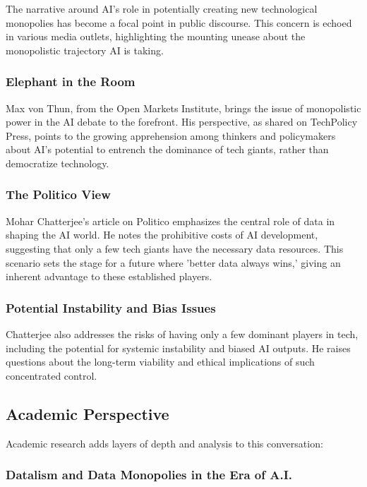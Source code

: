 \documentclass[11pt]{article}
\begin{document}
The narrative around AI's role in potentially creating new technological monopolies has become a focal point in public discourse. This concern is echoed in various media outlets, highlighting the mounting unease about the monopolistic trajectory AI is taking.

\subsubsection{Elephant in the Room}

Max von Thun, from the Open Markets Institute, brings the issue of monopolistic power in the AI debate to the forefront. His perspective, as shared on TechPolicy Press, points to the growing apprehension among thinkers and policymakers about AI's potential to entrench the dominance of tech giants, rather than democratize technology.

\subsubsection{The Politico View}

Mohar Chatterjee's article on Politico emphasizes the central role of data in shaping the AI world. He notes the prohibitive costs of AI development, suggesting that only a few tech giants have the necessary data resources. This scenario sets the stage for a future where 'better data always wins,' giving an inherent advantage to these established players.

\subsubsection{Potential Instability and Bias Issues}

Chatterjee also addresses the risks of having only a few dominant players in tech, including the potential for systemic instability and biased AI outputs. He raises questions about the long-term viability and ethical implications of such concentrated control.

\subsection{Academic Perspective}

Academic research adds layers of depth and analysis to this conversation:

\subsubsection{Datalism and Data Monopolies in the Era of A.I.}
\end{document}
